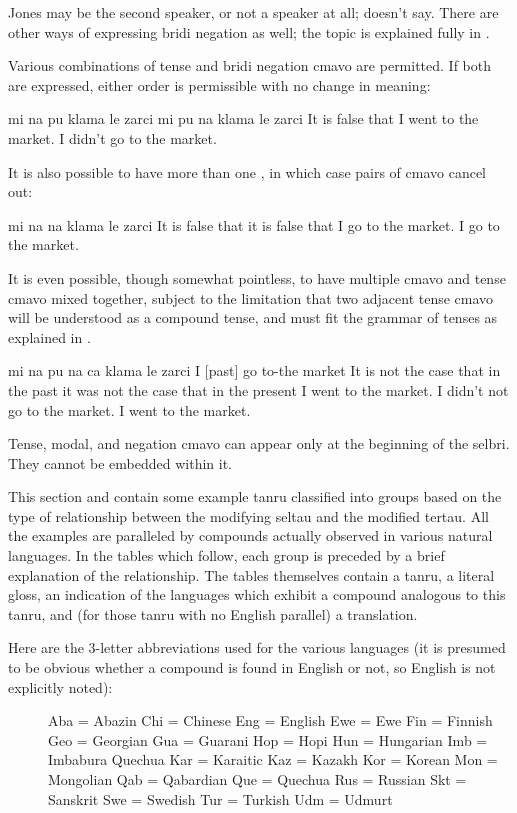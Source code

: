 Jones may be the second speaker, or not a speaker at all;  doesn't say. There are other
    ways of expressing bridi negation as well; the topic is
    explained fully in .

Various combinations of tense and bridi negation cmavo are
    permitted. If both are expressed, either order is permissible
    with no change in meaning:
\begin{example}
mi na pu klama le zarci\n
mi pu na klama le zarci\n
It is false that I went to the market.\n
I didn't go to the market.
\end{example}

It is also possible to have more than one , in which case
    pairs of  cmavo cancel out:
\begin{example}
mi na na klama le zarci\n
It is false that it is false that I go to the market.\n
I go to the market.
\end{example}

It is even possible, though somewhat pointless, to have
    multiple  cmavo and tense cmavo mixed together, subject
    to the limitation that two adjacent tense cmavo will be
    understood as a compound tense, and must fit the grammar of
    tenses as explained in .
\begin{example}
mi na pu na ca klama le zarci\n
I  [past]\n
\T	[not] [present] go to-the market\n
It is not the case that in the past it was not\n
\T	the case that in the present I went\n
\T	to the market.\n
I didn't not go to the market.\n
I went to the market.
\end{example}

Tense, modal, and negation cmavo can appear only at the
    beginning of the selbri. They cannot be embedded within it.



This section and  contain some
    example tanru classified into groups based on the type of
    relationship between the modifying seltau and the modified
    tertau. All the examples are paralleled by compounds actually
    observed in various natural languages. In the tables which
    follow, each group is preceded by a brief explanation of the
    relationship. The tables themselves contain a tanru, a literal
    gloss, an indication of the languages which exhibit a compound
    analogous to this tanru, and (for those tanru with no English
    parallel) a translation.

Here are the 3-letter abbreviations used for the various
    languages (it is presumed to be obvious whether a compound is
    found in English or not, so English is not explicitly
    noted):
\begin{description}
\item[] Aba = Abazin Chi = Chinese Eng = English Ewe = Ewe Fin = Finnish Geo = Georgian Gua = Guarani Hop = Hopi Hun = Hungarian Imb = Imbabura Quechua Kar = Karaitic Kaz = Kazakh Kor = Korean Mon = Mongolian Qab = Qabardian Que = Quechua Rus = Russian Skt = Sanskrit Swe = Swedish Tur = Turkish Udm = Udmurt

\end{description}

